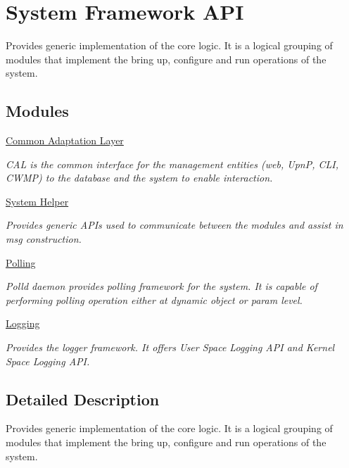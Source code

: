 \hypertarget{group__SYSFRAMEWORK}{\section{System Framework A\-P\-I}
\label{group__SYSFRAMEWORK}
}


Provides generic implementation of the core logic. It is a logical grouping of modules that implement the bring up, configure and run operations of the system.  


\subsection*{Modules}
\begin{DoxyCompactItemize}
\item 
\hyperlink{group__LIBCAL}{Common Adaptation Layer}
\begin{DoxyCompactList}\small\item\em C\-A\-L is the common interface for the management entities (web, Upn\-P, C\-L\-I, C\-W\-M\-P) to the database and the system to enable interaction. \end{DoxyCompactList}\item 
\hyperlink{group__LIBHELP}{System Helper}
\begin{DoxyCompactList}\small\item\em Provides generic A\-P\-Is used to communicate between the modules and assist in msg construction. \end{DoxyCompactList}\item 
\hyperlink{group__SYSFRAMEWORK__POLLD}{Polling}
\begin{DoxyCompactList}\small\item\em Polld daemon provides polling framework for the system. It is capable of performing polling operation either at dynamic object or param level. \end{DoxyCompactList}\item 
\hyperlink{group__SYSFRAMEWORK__LOG}{Logging}
\begin{DoxyCompactList}\small\item\em Provides the logger framework. It offers User Space Logging A\-P\-I and Kernel Space Logging A\-P\-I. \end{DoxyCompactList}\end{DoxyCompactItemize}


\subsection{Detailed Description}
Provides generic implementation of the core logic. It is a logical grouping of modules that implement the bring up, configure and run operations of the system. 
